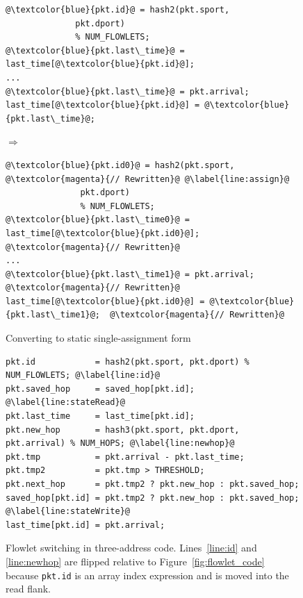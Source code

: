 \begin{figure}[!t]
  \begin{minipage}{\textwidth}
  \begin{minipage}{0.4\textwidth}
  \begin{small}
  \begin{lstlisting}[style=customc, numbers=none, frame=none]
@\textcolor{blue}{pkt.id}@ = hash2(pkt.sport,
              pkt.dport)
              % NUM_FLOWLETS;
@\textcolor{blue}{pkt.last\_time}@ = last_time[@\textcolor{blue}{pkt.id}@];
...
@\textcolor{blue}{pkt.last\_time}@ = pkt.arrival;
last_time[@\textcolor{blue}{pkt.id}@] = @\textcolor{blue}{pkt.last\_time}@;
  \end{lstlisting}
  \end{small}
  \end{minipage}
  $\Longrightarrow$
  \hspace{-0.2in}
%
  \begin{minipage}{0.6\textwidth}
  \begin{small}
  \begin{lstlisting}[style=customc, numbers=none, frame=none]
@\textcolor{blue}{pkt.id0}@ = hash2(pkt.sport,          @\textcolor{magenta}{// Rewritten}@ @\label{line:assign}@
               pkt.dport)
               % NUM_FLOWLETS;  
@\textcolor{blue}{pkt.last\_time0}@ = last_time[@\textcolor{blue}{pkt.id0}@];  @\textcolor{magenta}{// Rewritten}@
...
@\textcolor{blue}{pkt.last\_time1}@ = pkt.arrival;        @\textcolor{magenta}{// Rewritten}@
last_time[@\textcolor{blue}{pkt.id0}@] = @\textcolor{blue}{pkt.last\_time1}@;  @\textcolor{magenta}{// Rewritten}@
  \end{lstlisting}
  \end{small}
  \end{minipage}
  \caption[title]{Converting to static single-assignment form}
  \label{fig:ssa}
\end{minipage}
\end{figure}


\begin{figure}[!t]
\begin{minipage}{\textwidth}
\begin{lstlisting}[style=customc]
pkt.id            = hash2(pkt.sport, pkt.dport) % NUM_FLOWLETS; @\label{line:id}@
pkt.saved_hop     = saved_hop[pkt.id]; @\label{line:stateRead}@
pkt.last_time     = last_time[pkt.id];
pkt.new_hop       = hash3(pkt.sport, pkt.dport, pkt.arrival) % NUM_HOPS; @\label{line:newhop}@
pkt.tmp           = pkt.arrival - pkt.last_time;
pkt.tmp2          = pkt.tmp > THRESHOLD;
pkt.next_hop      = pkt.tmp2 ? pkt.new_hop : pkt.saved_hop;
saved_hop[pkt.id] = pkt.tmp2 ? pkt.new_hop : pkt.saved_hop; @\label{line:stateWrite}@
last_time[pkt.id] = pkt.arrival;
\end{lstlisting}
\caption[title2]{Flowlet switching in three-address
code. Lines~\ref{line:id} and \ref{line:newhop} are flipped relative
to Figure~\ref{fig:flowlet_code} because {\tt pkt.id} is an array index expression and is
moved into the read flank.}
\label{fig:three_address}
\end{minipage}
\vspace{-0.3cm}
\end{figure}

